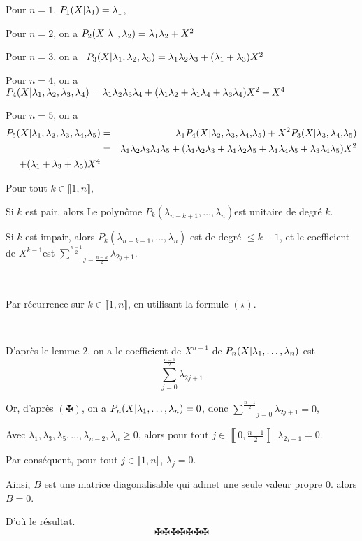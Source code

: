 Pour $n = 1$, $P_1 (X | \lambda_1 ) = \lambda_1$,

Pour $n = 2$, on a $P_2 (X | \lambda_1, \lambda_2 ) = \lambda_1
\lambda_2 + X^2$

Pour $n = 3$, on a \ $P_3 (X | \lambda_1, \lambda_2, \lambda_3 ) =
\lambda_1 \lambda_2 \lambda_3 + (\lambda_1 + \lambda_3) X^2$

Pour $n = 4$, on a $P_4 (X | \lambda_1, \lambda_2, \lambda_3, \lambda_4
) = \lambda_1 \lambda_2 \lambda_3 \lambda_4 + (\lambda_1 \lambda_2 +
\lambda_1 \lambda_4 + \lambda_3 \lambda_4) X^2 + X^4$

Pour $n = 5$, on a
\begin{eqnarray*}
  P_5 (X | \lambda_1, \lambda_2, \lambda_3, \lambda_4 {,} \lambda_5
  ) & = & \lambda_1 P_4 (X | \lambda_2, \lambda_3, \lambda_4 {,}
  \lambda_5 ) + X^2 P_3 (X | \lambda_3, \lambda_4 {,} \lambda_5
  )\\
  & = & \lambda_1 \lambda_2 \lambda_3 \lambda_4 \lambda_5 + (\lambda_1
  \lambda_2 \lambda_3 + \lambda_1 \lambda_2 \lambda_5 + \lambda_1 \lambda_4
  \lambda_5 + \lambda_3 \lambda_4 \lambda_5) X^2 \\
  + (\lambda_1 + \lambda_3 + \lambda_5) X^4
\end{eqnarray*}



Pour tout $k \in \llbracket 1, n \rrbracket,$

Si $k$ est pair, alors Le polyn{\^o}me $P_k (\lambda_{n - k + 1}, \ldots,
\lambda_n) $est unitaire de degr{\'e} $k$.

Si $k$ est impair, alors $P_k (\lambda_{n - k + 1}, \ldots, \lambda_n)$ est de
degr{\'e} $\leqslant k - 1$, et le coefficient de $X^{k - 1} $est $\underset{j
= \frac{n - k}{2}}{\overset{\frac{n - 1}{2}}{\sum}} \lambda_{2 j + 1}$.

\


Par r{\'e}currence sur $k \in \llbracket 1, n \rrbracket$, en utilisant la
formule $(\star)$.

\

D'apr{\`e}s le lemme 2, on a le coefficient de $X^{n - 1}$ de $P_n (X |
\lambda_1, \ldots, \lambda_n )$ est
\[ \underset{j = 0}{\overset{\frac{n - 1}{2}}{\sum}} \lambda_{2 j + 1} \]


Or, d'apr{\`e}s $(\maltese)$, on a $P_n (X | \lambda_1, \ldots, \lambda_n
) = 0$, donc $\underset{j = 0}{\overset{\frac{n - 1}{2}}{\sum}}
\lambda_{2 j + 1} = 0$,

Avec $\lambda_1, \lambda_3, \lambda_5, \ldots, \lambda_{n - 2}, \lambda_n
\geqslant 0$, alors pour tout $j \in \left\llbracket 0, \frac{n - 1}{2}
\right\rrbracket$ $\lambda_{2 j + 1} = 0$.

Par cons{\'e}quent, pour tout $j \in \llbracket 1, n \rrbracket$, $\lambda_j =
0$.

Ainsi, $B$ est une matrice diagonalisable qui admet une seule valeur propre
$0$. alors $B = 0$.

D'o{\`u} le r{\'e}sultat.
\[ \maltese \maltese \maltese \maltese \maltese \maltese \maltese \]
